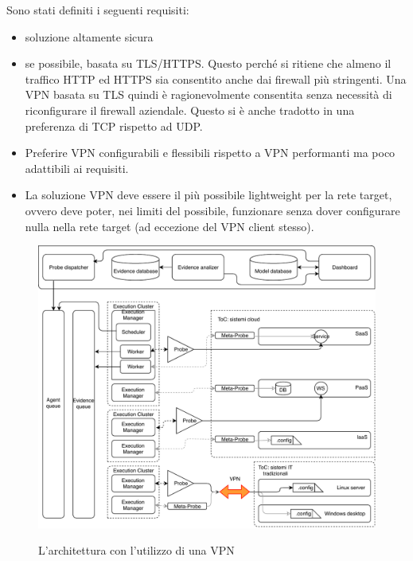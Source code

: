 Sono stati definiti i seguenti requisiti:
\begin{itemize}
	\item soluzione altamente sicura
	\item se possibile, basata su TLS/HTTPS. Questo perché si ritiene che
	      almeno il traffico HTTP ed HTTPS sia consentito anche dai firewall
	      più stringenti. Una VPN basata su TLS quindi è ragionevolmente consentita
	      senza necessità di riconfigurare il firewall aziendale.
	      Questo si è anche tradotto in una preferenza di TCP rispetto ad UDP.
	\item Preferire VPN configurabili e flessibili rispetto a
	      VPN performanti ma poco adattibili ai requisiti.
	\item La soluzione VPN deve essere il più possibile lightweight
	      per la rete target, ovvero deve poter, nei limiti del
	      possibile, funzionare senza dover configurare nulla nella rete
	      target (ad eccezione del VPN client stesso).
\end{itemize}

\begin{figure}
	\includegraphics[scale=0.6]{img/mooncloud_archi_extended}
	\label{fig:mooncloud-archi-extended}
	\caption[L'architettura con l'utilizzo di una VPN per
	consentire l'analisi di sistemi IT tradizionali]
	{L'architettura con l'utilizzo di una VPN}
\end{figure}